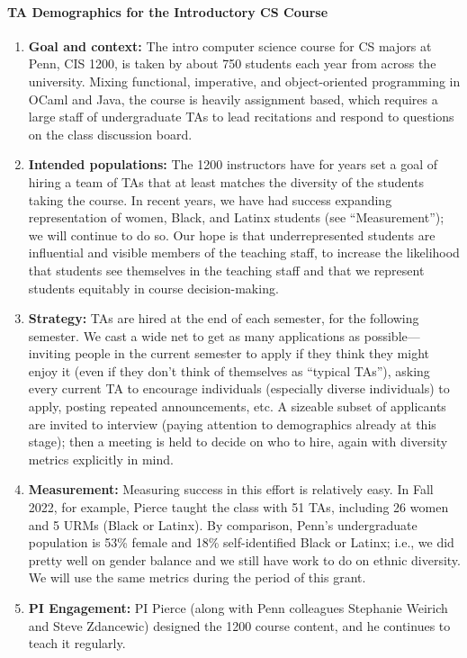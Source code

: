 
\paragraph*{TA Demographics for the Introductory CS Course}

\begin{enumerate}
\item {\bf Goal and context:} The intro computer science course for CS
majors at Penn, CIS 1200, is taken by about 750 students each year
from across the university.  Mixing functional, imperative, and
object-oriented programming in OCaml and Java, the course is heavily
assignment based, which requires a large staff of undergraduate TAs to
lead recitations and respond to questions on the class discussion
board.

\item {\bf Intended populations:} The 1200 instructors have for years
set a goal of hiring a team of TAs that at least matches the diversity of the
students taking the course. In recent years, we have had success expanding
representation of women, Black, and Latinx students (see ``Measurement''); we
will continue to do so. Our hope is that underrepresented students are
influential and visible members of the teaching staff, to increase the
likelihood that students see themselves in the teaching staff and that we
represent students equitably in course decision-making.  

\item {\bf Strategy:} TAs are hired at the end of each semester, for
the following semester.  We cast a wide net to get as many
applications as possible---inviting people in the current semester to
apply if they think they might enjoy it (even if they don't think of
themselves as ``typical TAs''), asking every current TA to encourage
individuals (especially diverse individuals) to apply, posting
repeated announcements, etc.  A sizeable subset of applicants are
invited to interview (paying attention to demographics already at this
stage); then a meeting is held to decide on who to hire, again with
diversity metrics explicitly in mind.

\item {\bf Measurement:} Measuring success in this effort is
relatively easy.  In Fall 2022, for example, Pierce taught the class
with 51 TAs, including 26 women and 5 URMs (Black or Latinx).  By
comparison, Penn's undergraduate population is 53\% female and 18\%
self-identified Black or Latinx; i.e., we did pretty well on gender balance
and we still have work to do on ethnic diversity.  We will use the
same metrics during the period of this grant.

\item {\bf PI Engagement:} PI Pierce (along with Penn colleagues
Stephanie Weirich and Steve Zdancewic) designed the 1200 course
content, and he continues to teach it regularly.
\end{enumerate}



